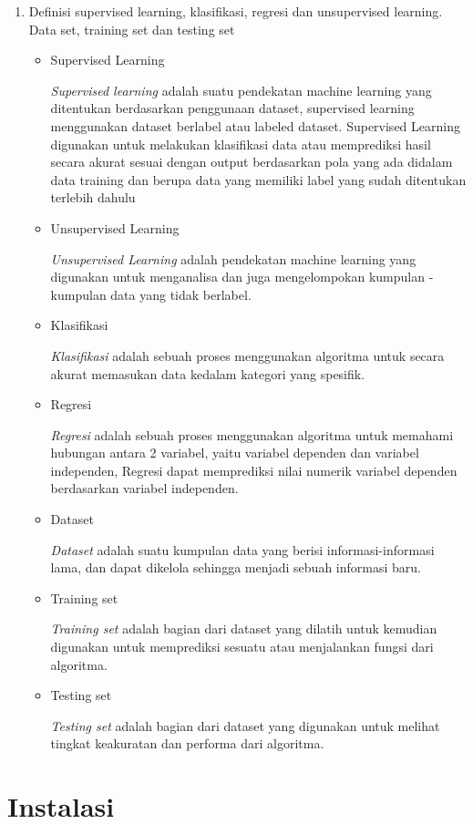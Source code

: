\begin{enumerate}
	\item Definisi supervised learning, klasifikasi, regresi dan unsupervised learning. Data set, training set dan testing set
	\begin{itemize}
		\item Supervised Learning
		\par
		\textit{Supervised learning}
		adalah suatu pendekatan machine learning yang ditentukan berdasarkan penggunaan dataset, supervised learning menggunakan dataset berlabel atau labeled dataset. Supervised Learning digunakan untuk melakukan klasifikasi data atau memprediksi hasil secara akurat sesuai dengan output berdasarkan pola yang ada didalam data training dan berupa data yang memiliki label yang sudah ditentukan terlebih dahulu
		\item Unsupervised Learning
		\par
		\textit{Unsupervised Learning} adalah pendekatan machine learning yang digunakan untuk menganalisa dan juga mengelompokan kumpulan - kumpulan data yang tidak berlabel.
		\item Klasifikasi
		\par
		\textit{Klasifikasi} adalah sebuah proses menggunakan algoritma untuk secara akurat memasukan data kedalam kategori yang spesifik.
		\item Regresi
		\par
		\textit{Regresi} adalah sebuah proses menggunakan algoritma untuk memahami hubungan antara 2 variabel, yaitu variabel dependen dan variabel independen, Regresi dapat memprediksi nilai numerik variabel dependen berdasarkan variabel independen.
		\item Dataset
		\par
		\textit{Dataset} adalah suatu kumpulan data yang berisi informasi-informasi lama, dan dapat dikelola sehingga menjadi sebuah informasi baru.
		\item Training set
		\par
		\textit{Training set} adalah bagian dari dataset yang dilatih untuk kemudian digunakan untuk memprediksi sesuatu atau menjalankan fungsi dari algoritma.
		\item Testing set
		\par
		\textit{Testing set} adalah bagian dari dataset yang digunakan untuk melihat tingkat keakuratan dan performa dari algoritma.
	\end{itemize}

\end{enumerate}


\section{Instalasi}

